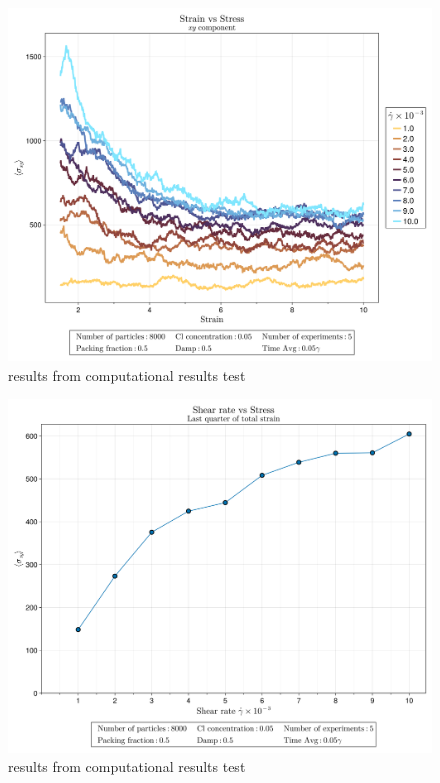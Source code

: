 \begin{figure}[ht!]
    \centering
    \includegraphics[width=\textwidth]{figs/ComputaitonalResults/CL5/ViscoElasticStrainStressXY.png}
    \caption{results from computational results test}
\end{figure}

\begin{figure}[ht!]
    \centering
    \includegraphics[width=\textwidth]{figs/ComputaitonalResults/CL5/shearRate.png}
    \caption{results from computational results test}
\end{figure}

